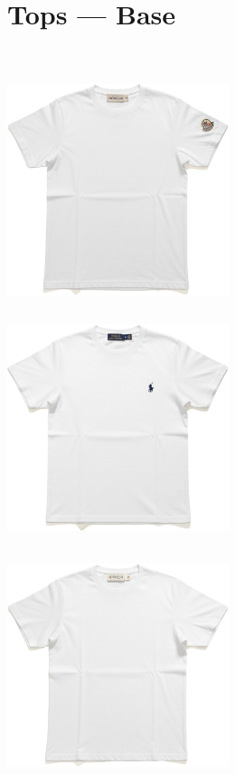 \documentclass[10pt]{article}
\begin{document}
\section*{Tops — Base}\
\vspace*{2mm}\noindent
\begin{minipage}[c][64.75mm][c]{64.75mm}\centering
\includegraphics[width=64.75mm,height=64.75mm,keepaspectratio]{assets/tees/white-moncler-tee.png}\
\end{minipage} \hspace*{6.00mm} \begin{minipage}[c][64.75mm][c]{64.75mm}\centering
\includegraphics[width=64.75mm,height=64.75mm,keepaspectratio]{assets/tees/white-polo-tee.png}\
\end{minipage} \hspace*{6.00mm} \begin{minipage}[c][64.75mm][c]{64.75mm}\centering
\includegraphics[width=64.75mm,height=64.75mm,keepaspectratio]{assets/tees/white-wide-tee.png}\

\end{minipage}
\end{document}
